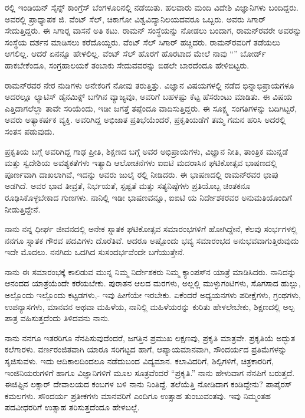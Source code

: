 ರಲ್ಲಿ ಇಂಡಿಯನ್ ಸೈನ್ಸ್ ಕಾಂಗ್ರೆಸ್ ಬೆಂಗಳೂರಿನಲ್ಲಿ ನಡೆಯಿತು. ಹಲವಾರು ಮಂದಿ ವಿದೇಶಿ ವಿಜ್ಞಾನಿಗಳು ಬಂದಿದ್ದರು. ಅವರಲ್ಲಿ ಪ್ರಾಧ್ಯಾಪಕ ಜಿ. ವೆಂಟ್ ಸೆಲ್, ಚಿಕಾಗೋ ವಿಶ್ವವಿದ್ಯಾನಿಲಯದವರೂ ಒಬ್ಬರು. ಅವರು ಸಿಗಾರ್ ಸೇದುತ್ತಿದ್ದರು. ಈ ಸಿಗಾರ್‍ನ ವಾಸನೆ ಅತಿ ಕಟು. ರಾಮನ್ ಸಂಸ್ಥೆಯನ್ನು ನೋಡಲು ಬಂದಾಗ, ರಾಮನ್‍ರವರೇ ಅವರನ್ನು ಸಂಸ್ಥೆಯ ದರ್ಶನ ಮಾಡಿಸಲು ಕರೆದೊಯ್ದರು. ವೆಂಟ್ ಸೆಲ್ ಸಿಗಾರ್ ಹಚ್ಚಿದರು. ರಾಮನ್‍ರವರಿಗೆ ತಡೆಯಲು ಆಗಲಿಲ್ಲ. ಆದರೆ ಏನನ್ನೂ ಹೇಳಲಿಲ್ಲ. ವೆಂಟ್ ಸೆಲ್ ಹೊರಗೆ ಹೊರಟಾದ ಮೇಲೆ ನಾವು “” ಬೋರ್ಡ್ ಹಾಕಬೇಕೆಂದೂ, ಸಂಗ್ರಹಾಲಯಕೆ ತಂಬಾಕು ಸೇದುವವರನ್ನು ಬಿಡಲೇ ಬಾರದೆಂದೂ ಹೇಳಿಬಿಟ್ಟರು.

ರಾಮನ್‍ರವರ ನೇರ ನುಡಿಗಳು ಅನೇಕರಿಗೆ ನೋವು ತರುತ್ತಿತ್ತು. ವಿಜ್ಞಾನ ವಿಷಯಗಳಲ್ಲಿ ನಡೆದ ಭಿನ್ನಾಭಿಪ್ರಾಯಗಳೂ ಅದರಲ್ಲೂ ಲ್ಯಾಟಿಸ್ ಡೈನಮಿಕ್ಸ್ ಬಗೆಗಿನ ವ್ಯಾಜ್ಯವೂ, ಅವರಿಗೆ ಬಹಳಷ್ಟು ಕೆಟ್ಟ ಹೆಸರುಂಟು ಮಾಡಿತು. ಈ ವಿಷಯ ಎತ್ತಿದಾಗಲೆಲ್ಲಾ ತಾವೇ ಸರಿಯೆಂದು, ಇಡೀ ಜಗತ್ತೆ ತಪ್ಪೆಂದೂ ವಾದಿಸುತ್ತಿದ್ದರು. ಈ ಸೂಕ್ಷ್ಮ ಸಂಗತಿಗಳನ್ನು ಬದಿಗಿಟ್ಟರೆ, ಅವರು ಅತ್ಯಾಕರ್ಷಕ ವ್ಯಕ್ತಿ. ಅವರಿಗಿದ್ದ ಅಭಿಜಾತ ಪ್ರತಿಭೆಯೆಂದರೆ, ಪ್ರಕೃತಿಯಡೆಗೆ ತಮ್ಮ ಗಮನ ಹರಿಸಿ ಅದರಲ್ಲಿ ಸಂತಸ ಪಡುವುದು.

ಪ್ರಕೃತಿಯ ಬಗ್ಗೆ ಅವರಿಗಿದ್ದ ಗಾಢ ಪ್ರೀತಿ, ಶಿಕ್ಷಣದ ಬಗ್ಗೆ ಅವರ ಅಭಿಪ್ರಾಯಗಳು, ವಿಜ್ಞಾನ ನೀತಿ, ತಾಂತ್ರಿಕ ಮುನ್ನಡೆ ಮತ್ತು ಸ್ವದೇಶಿಯ ಅವಶ್ಯಕತೆಗಳು ಇತ್ಯಾದಿ ಆಲೋಚನೆಗಳು ಐಐಟಿ ಮದರಾಸಿನ ಘಟಿಕೋತ್ಸವ ಭಾಷಣದಲ್ಲಿ ಪೂರ್ಣವಾಗಿ ದಾಖಲಾಗಿವೆ, ಇದನ್ನು ಅವರು  ಜುಲೈ ರಲ್ಲಿ ನೀಡಿದರು. ಈ ಭಾಷಣದಲ್ಲಿ ರಾಮನ್‍ರವರ ಛಾಪು ಅಡಗಿದೆ. ಅವರ ಭಾವ ತೀವ್ರತೆ, ನಿರ್ಭಯತೆ, ಸ್ಪಷ್ಟತೆ ಮತ್ತು ಸತ್ಯನಿಷ್ಠೆಗಳು ಪ್ರತಿಯೊಬ್ಬ ಚಿಂತಕನೂ ರೂಢಿಸಿಕೊಳ್ಳಬೇಕಾದ ಗುಣಗಳು. ನಾನಿಲ್ಲಿ ಇಡೀ ಭಾಷಣವನ್ನೂ, ಐಐಟಿ ಯ ನಿರ್ದೇಶಕರವರ ಅನುಮತಿಯೊಂದಿಗೆ ನೀಡುತ್ತಿದ್ದೇನೆ.



ನಾನು ನನ್ನ ಧೀರ್ಘ ಜೀವನದಲ್ಲಿ ಅನೇಕ ಸ್ನಾತಕ ಘಟಿಕೋತ್ಸವ ಸಮಾರಂಭಗಳಿಗೆ ಹೋಗಿದ್ದೇನೆ, ಕೆಲವು ಸಂರ್ಭಗಳಲ್ಲಿ ನನಗೂ ಸ್ನಾತಕ ಗೌರವ ಪದವಿಗಳು ದೊರೆತಿವೆ. ಆದರೂ ಅಷ್ಟೊಂದು ಭವ್ಯ ಸಮಾರಂಭದ ಅನುಭವವಾಗುತ್ತಿರುವುದು ಇದೇ ಮೊದಲು. ನನಗಿದು ಒದಗಿದ ಸುಸಂದರ್ಭವೆಂದೇ ಬಗೆಯುತ್ತೇನೆ.

ನಾನು ಈ ಸಮಾರಂಭಕ್ಕೆ ಕಾಲಿಡುವ ಮುನ್ನ ನಿಮ್ಮ ನಿರ್ದೇಶಕರು ನಿಮ್ಮ ಕ್ಯಾಂಪಸ್‍ನ ಯಾತ್ರೆ ಮಾಡಿಸಿದರು. ನಾನಿದನ್ನು ಆನಂದದ ಯಾತ್ರೆಯೆಂದೇ ಕರೆಯಬೇಕು. ಪುರಾತನ ಆಲದ ಮರಗಳು, ಅಲ್ಲಲ್ಲಿ ಮುಳ್ಳುಗಂಟಿಗಳು, ಸೊಗಸಾದ ಹುಲ್ಲು, ಅಲ್ಲೊಂದು ಇಲ್ಲೊಂದು ಕಟ್ಟಡಗಳು,- ಇವು ಹೀಗೆಯೇ ಇರಬೇಕು. ಏಕೆಂದರೆ ಅಧ್ಯಯನಗಳು ಪರೀಕ್ಷೆಗಳು, ಗ್ರಂಥಗಳು, ಉಪನ್ಯಾಸಗಳು, ಮಾನವನ ಅಥವಾ ಮಹಿಳೆಯ, ನಾನಿಲ್ಲಿ ಮಹಿಳೆಯರನ್ನು ಕುರಿತು ಹೇಳಲೇಬೇಕು, ಶಿಕ್ಷಣದಲ್ಲಿ ಅಲ್ಪ ಪಾತ್ರ ವಹಿಸುತ್ತದೆಂದು ತಿಳಿದವನು ನಾನು.

ನಾನು ನನಗೂ ಇತರರಿಗೂ ನೆನಪಿಸುವುದೆಂದರೆ, ಜಗತ್ತಿನ ಪ್ರಮುಖ ಲಕ್ಷಣವು, ಪ್ರಕೃತಿ ಮಾತ್ರವೇ. ಪ್ರಕೃತಿಯೆ ಅದ್ಭುತ ಕಲೆಗಾರಳು. ವರ್ಣರಂಜಿತವಾಗಿ ಯಾರೂ ಸರಿಗಟ್ಟದ ಹಾಗೆ, ಆಪ್ಯಾಯಮಾನವಾಗಿ, ಸೌಂದರ್ಯದ ಪ್ರತಿಮೆಗಳನ್ನು ಸೃಜಿಸುವಳು. ಇದು ಆದಿಕಾಲದಿಂದಲೂ ನಡೆದುಬಂದ ವಿದ್ಯಮಾನ. ಕಲಾವಿದರಿಗೆ, ಶಿಲ್ಪಿಗಳಿಗೆ, ಚಿತ್ರಕಾರರಿಗೆ, ಇಂಜಿನಿಯರುಗಳಿಗೆ ಹಾಗೂ ವಿಜ್ಞಾನಿಗಳಿಗೆ ಮೂಲ ಸೂತ್ರವೆಂದರೆ “ಪ್ರಕೃತಿ.” ನಾನು ಹೇಳುವಾಗ ನೆನಪಿಗೆ ಬರುತ್ತದೆ. ಈಜಿಫ್ಟಿನ ಲಕ್ಸಾರ್ ದೇವಾಲಯದ ಕಂಬಗಳ ಬಳಿ ನಾನು ನಿಂತಿದ್ದೆ. ತಲೆಯೆತ್ತಿ ನೋಡಿದಾಗ ಕಂಡಿದ್ದೇನು? ಪಾಪೈರಸ್ ಕಮಲಗಳು. ಸೌಂದರ್ಯ ಪ್ರತೀಕಗಳು ಮಾನವರಿಗೆ ಎಂದಿಗೂ ಉತ್ಸಾಹ ತುಂಬುವಂತವು. ಇವು ನಿಮ್ಮಂತಹ ಪದವೀಧರರಿಗೆ ಉತ್ಸಾಹ ತರಿಸುತ್ತದೆಂದೂ ಹೇಳಬಲ್ಲೆ.

